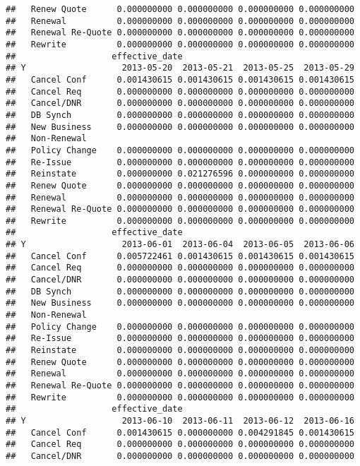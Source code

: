 \documentclass[]{article}
\begin{document}
\begin{verbatim}
##   Renew Quote      0.000000000 0.000000000 0.000000000 0.000000000
##   Renewal          0.000000000 0.000000000 0.000000000 0.000000000
##   Renewal Re-Quote 0.000000000 0.000000000 0.000000000 0.000000000
##   Rewrite          0.000000000 0.000000000 0.000000000 0.000000000
##                   effective_date
## Y                   2013-05-20  2013-05-21  2013-05-25  2013-05-29
##   Cancel Conf      0.001430615 0.001430615 0.001430615 0.001430615
##   Cancel Req       0.000000000 0.000000000 0.000000000 0.000000000
##   Cancel/DNR       0.000000000 0.000000000 0.000000000 0.000000000
##   DB Synch         0.000000000 0.000000000 0.000000000 0.000000000
##   New Business     0.000000000 0.000000000 0.000000000 0.000000000
##   Non-Renewal                                                     
##   Policy Change    0.000000000 0.000000000 0.000000000 0.000000000
##   Re-Issue         0.000000000 0.000000000 0.000000000 0.000000000
##   Reinstate        0.000000000 0.021276596 0.000000000 0.000000000
##   Renew Quote      0.000000000 0.000000000 0.000000000 0.000000000
##   Renewal          0.000000000 0.000000000 0.000000000 0.000000000
##   Renewal Re-Quote 0.000000000 0.000000000 0.000000000 0.000000000
##   Rewrite          0.000000000 0.000000000 0.000000000 0.000000000
##                   effective_date
## Y                   2013-06-01  2013-06-04  2013-06-05  2013-06-06
##   Cancel Conf      0.005722461 0.001430615 0.001430615 0.001430615
##   Cancel Req       0.000000000 0.000000000 0.000000000 0.000000000
##   Cancel/DNR       0.000000000 0.000000000 0.000000000 0.000000000
##   DB Synch         0.000000000 0.000000000 0.000000000 0.000000000
##   New Business     0.000000000 0.000000000 0.000000000 0.000000000
##   Non-Renewal                                                     
##   Policy Change    0.000000000 0.000000000 0.000000000 0.000000000
##   Re-Issue         0.000000000 0.000000000 0.000000000 0.000000000
##   Reinstate        0.000000000 0.000000000 0.000000000 0.000000000
##   Renew Quote      0.000000000 0.000000000 0.000000000 0.000000000
##   Renewal          0.000000000 0.000000000 0.000000000 0.000000000
##   Renewal Re-Quote 0.000000000 0.000000000 0.000000000 0.000000000
##   Rewrite          0.000000000 0.000000000 0.000000000 0.000000000
##                   effective_date
## Y                   2013-06-10  2013-06-11  2013-06-12  2013-06-16
##   Cancel Conf      0.001430615 0.000000000 0.004291845 0.001430615
##   Cancel Req       0.000000000 0.000000000 0.000000000 0.000000000
##   Cancel/DNR       0.000000000 0.000000000 0.000000000 0.000000000

\end{verbatim}
\end{document}
